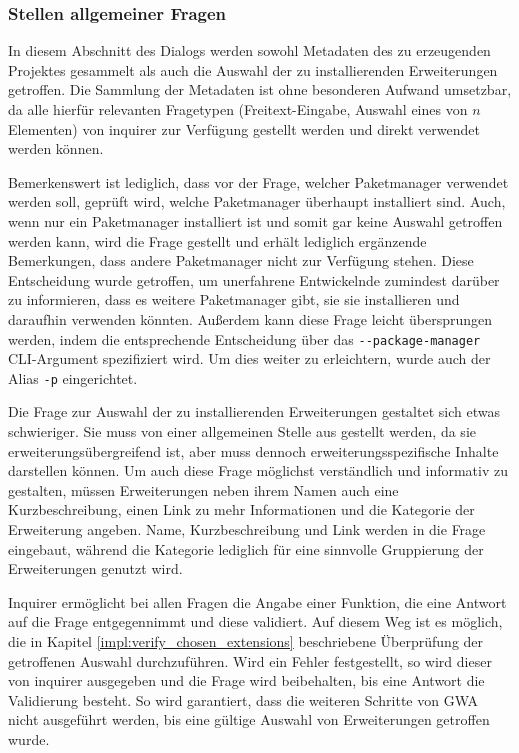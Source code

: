 \subsubsection{Stellen allgemeiner Fragen}
\label{impl:general_questions}
In diesem Abschnitt des Dialogs werden sowohl Metadaten des zu erzeugenden Projektes gesammelt als auch die Auswahl der zu installierenden Erweiterungen getroffen. Die Sammlung der Metadaten ist ohne besonderen Aufwand umsetzbar, da alle hierfür relevanten Fragetypen (Freitext-Eingabe, Auswahl eines von $n$ Elementen) von inquirer zur Verfügung gestellt werden und direkt verwendet werden können.

Bemerkenswert ist lediglich, dass vor der Frage, welcher Paketmanager verwendet werden soll, geprüft wird, welche Paketmanager überhaupt installiert sind. Auch, wenn nur ein Paketmanager installiert ist und somit gar keine Auswahl getroffen werden kann, wird die Frage gestellt und erhält lediglich ergänzende Bemerkungen, dass andere Paketmanager nicht zur Verfügung stehen. Diese Entscheidung wurde getroffen, um unerfahrene Entwickelnde zumindest darüber zu informieren, dass es weitere Paketmanager gibt, sie sie installieren und daraufhin verwenden könnten. Außerdem kann diese Frage leicht übersprungen werden, indem die entsprechende Entscheidung über das \verb|--package-manager| \gls{CLI}-Argument spezifiziert wird. Um dies weiter zu erleichtern, wurde auch der Alias \verb|-p| eingerichtet.

Die Frage zur Auswahl der zu installierenden Erweiterungen gestaltet sich etwas schwieriger. Sie muss von einer allgemeinen Stelle aus gestellt werden, da sie erweiterungsübergreifend ist, aber muss dennoch erweiterungsspezifische Inhalte darstellen können. Um auch diese Frage möglichst verständlich und informativ zu gestalten, müssen Erweiterungen neben ihrem Namen auch eine Kurzbeschreibung, einen Link zu mehr Informationen und die Kategorie der Erweiterung angeben. Name, Kurzbeschreibung und Link werden in die Frage eingebaut, während die Kategorie lediglich für eine sinnvolle Gruppierung der Erweiterungen genutzt wird.

Inquirer ermöglicht bei allen Fragen die Angabe einer Funktion, die eine Antwort auf die Frage entgegennimmt und diese validiert. Auf diesem Weg ist es möglich, die in Kapitel \ref{impl:verify_chosen_extensions} beschriebene Überprüfung der getroffenen Auswahl durchzuführen. Wird ein Fehler festgestellt, so wird dieser von inquirer ausgegeben und die Frage wird beibehalten, bis eine Antwort die Validierung besteht. So wird garantiert, dass die weiteren Schritte von \gls{GWA} nicht ausgeführt werden, bis eine gültige Auswahl von Erweiterungen getroffen wurde.

